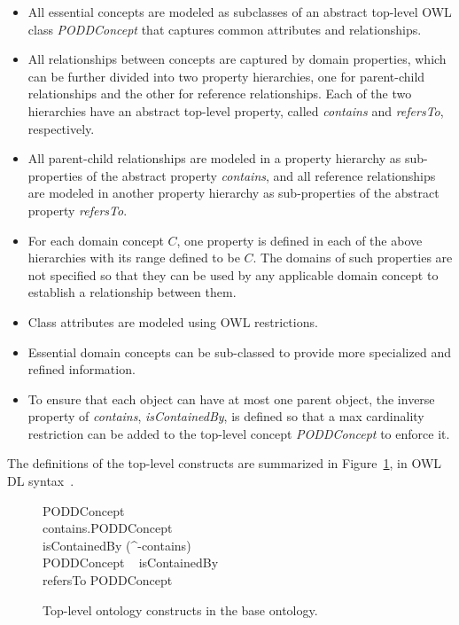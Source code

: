 \documentclass[conference,10pt]{IEEEtran}
\begin{document}
\begin{itemize}
\item All essential concepts are modeled as subclasses of an abstract top-level OWL class \emph{PODDConcept} that captures common attributes and relationships.

\item All relationships between concepts are captured by domain properties, which can be further divided into two property hierarchies, one for parent-child relationships and the other for reference relationships. Each of the two hierarchies have an abstract top-level property, called \emph{contains} and \emph{refersTo}, respectively. 

\item All parent-child relationships are modeled in a property hierarchy as sub-properties of the abstract property \emph{contains}, and all reference relationships are modeled in another property hierarchy as sub-properties of the abstract property \emph{refersTo}.

\item For each domain concept $C$, one property is defined in each of the above hierarchies with its range defined to be $C$. The domains of such properties are not specified so that they can be used by any applicable domain concept to establish a relationship between them.

\item Class attributes are modeled using OWL restrictions.

\item Essential domain concepts can be sub-classed to provide more specialized and refined information. 

\item To ensure that each object can have at most one parent object, the inverse property of \emph{contains}, \emph{isContainedBy}, is defined so that a max cardinality restriction can be added to the top-level concept \emph{PODDConcept} to enforce it. 
\end{itemize}

The definitions of the top-level constructs are summarized in Figure~\ref{for:concept}, in OWL DL syntax~\cite{hoph03a}.

\vspace{-8pt}
\begin{figure}[htb]
\centering\small
\begin{zed}
PODDConcept \sqsubseteq \top\\
\top \sqsubseteq \forall contains.PODDConcept\\
isContainedBy \sqsubseteq (^-contains)\\
PODDConcept \sqsubseteq {}~ isContainedBy\\
\top \sqsubseteq \forall refersTo PODDConcept
\end{zed}

\vspace{-12pt}
\caption{Top-level ontology constructs in the base ontology.}\label{for:concept}
\end{figure}
\end{document}
